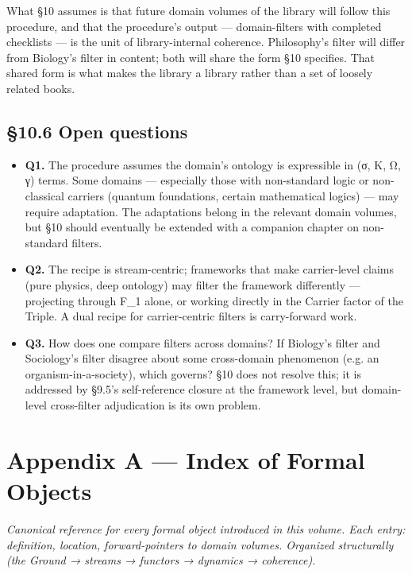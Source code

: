 \documentclass[11pt, openany]{book}
\newcommand{\sectionbreak}{\clearpage}
\begin{document}
What §10 assumes is that future domain volumes of the library will follow this procedure, and that the procedure's output --- domain-filters with completed checklists --- is the unit of library-internal coherence. Philosophy's filter will differ from Biology's filter in content; both will share the form §10 specifies. That shared form is what makes the library a library rather than a set of loosely related books.

\sectionbreak

\section{§10.6 Open questions}

\begin{itemize}
\item \textbf{Q1.} The procedure assumes the domain's ontology is expressible in (σ, K, Ω, γ) terms. Some domains --- especially those with non-standard logic or non-classical carriers (quantum foundations, certain mathematical logics) --- may require adaptation. The adaptations belong in the relevant domain volumes, but §10 should eventually be extended with a companion chapter on non-standard filters.
\item \textbf{Q2.} The recipe is stream-centric; frameworks that make carrier-level claims (pure physics, deep ontology) may filter the framework differently --- projecting through F\_\allowbreak{}1 alone, or working directly in the Carrier factor of the Triple. A dual recipe for carrier-centric filters is carry-forward work.
\item \textbf{Q3.} How does one compare filters across domains? If Biology's filter and Sociology's filter disagree about some cross-domain phenomenon (e.g. an organism-in-a-society), which governs? §10 does not resolve this; it is addressed by §9.5's self-reference closure at the framework level, but domain-level cross-filter adjudication is its own problem.
\end{itemize}

\chapter{Appendix A — Index of Formal Objects}


\textit{Canonical reference for every formal object introduced in this volume. Each entry: definition, location, forward-pointers to domain volumes. Organized structurally (the Ground → streams → functors → dynamics → coherence).}
\end{document}
